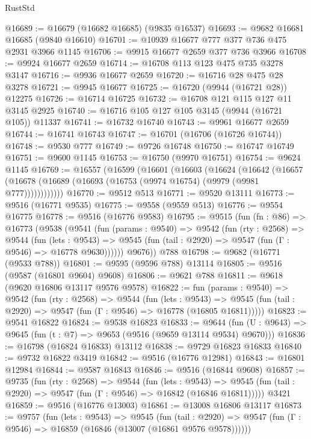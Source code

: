 \begin{lexlean}{RustStd}
\begin{coremodule}
@16689 := @16679 (@16682 @16685) (@9835 @16537)
@16693 := @9682 @16681 @16685 (@9840 @16610)
@16701 := @10939 @16677 @777 @377 @736 @475 @2931 @3966 @1145
@16706 := @9915 @16677 @2659 @377 @736 @3966
@16708 := @9924 @16677 @2659
@16714 := @16708 @113 @123 @475 @735 @3278 @3147
@16716 := @9936 @16677 @2659
@16720 := @16716 @28 @475 @28 @3278
@16721 := @9945 @16677
@16725 := @16720 (@9944 (@16721 @28)) @12275
@16726 := @16714 @16725
@16732 := @16708 @121 @115 @127 @11 @3145 @2925
@16740 := @16716 @105 @127 @105 @3145 (@9944 (@16721 @105)) @11337
@16741 := @16732 @16740
@16743 := @9961 @16677 @2659
@16744 := @16741 @16743
@16747 := @16701 (@16706 (@16726 @16744))
@16748 := @9530 @777
@16749 := @9726 @16748
@16750 := @16747 @16749
@16751 := @9600 @1145
@16753 := @16750 (@9970 @16751)
@16754 := @9624 @1145
@16769 := @16557
    (@16599
      (@16601
        (@16603
          (@16624
            (@16642
              (@16657 (@16678 (@16689 (@16693 (@16753 (@9974 @16754) (@9979 (@9981 @777))))))))))))
@16770 := @9512 @513
@16771 := @9520 @13111
@16773 := @9516 (@16771 @9535)
@16775 := @9558 (@9559 @513)
@16776 := @9554 @16775
@16778 := @9516 (@16776 @9583)
@16795 := @9515
    (fun (fn : @86) =>
    @16773
      (@9538
        (@9541
          (fun (params : @9540) =>
          @9542
            (fun (rty : @2568) =>
            @9544
              (fun (lets : @9543) =>
              @9545 (fun (tail : @2920) => @9547 (fun (Γ : @9546) => @16778 @9630))))))
        @9676))
    @788
@16798 := @9682 (@16771 (@9533 @788))
@16801 := @9595 (@9596 @788) @13114
@16805 := @9516 (@9587 (@16801 @9604) @9608)
@16806 := @9621 @788
@16811 := @9618 (@9620 @16806 @13117 @9576 @9578)
@16822 := fun (params : @9540) =>
  @9542
    (fun (rty : @2568) =>
    @9544
      (fun (lets : @9543) =>
      @9545 (fun (tail : @2920) => @9547 (fun (Γ : @9546) => @16778 (@16805 @16811)))))
@16823 := @9541 @16822
@16824 := @9538 @16823
@16833 := @9644
    (fun (U : @9643) => @9645 (fun (t : @7) => @9653 (@9516 (@9659 @13114 @9534) @9670)))
@16836 := @16798 (@16824 @16833) @13112
@16838 := @9729 @16823 @16833
@16840 := @9732 @16822 @3419
@16842 := @9516 (@16776 @12981)
@16843 := @16801 @12984
@16844 := @9587 @16843
@16846 := @9516 (@16844 @9608)
@16857 := @9735
    (fun (rty : @2568) =>
    @9544
      (fun (lets : @9543) =>
      @9545 (fun (tail : @2920) => @9547 (fun (Γ : @9546) => @16842 (@16846 @16811)))))
    @3421
@16859 := @9516 (@16776 @13003)
@16861 := @13008 @16806 @13117
@16873 := @9757
    (fun (lets : @9543) =>
    @9545
      (fun (tail : @2920) =>
      @9547 (fun (Γ : @9546) => @16859 (@16846 (@13007 (@16861 @9576 @9578))))))

\end{coremodule}
\end{lexlean}
